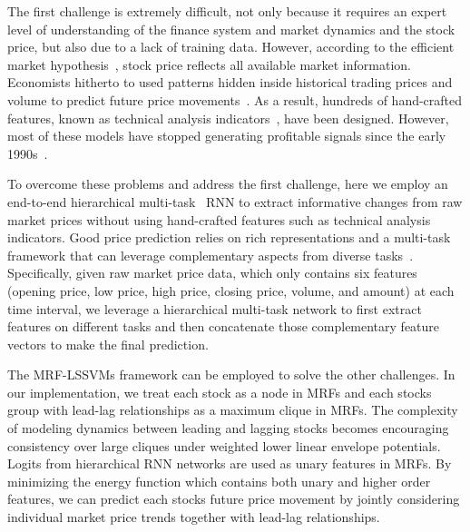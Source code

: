 The first challenge is extremely difficult, not only because it
requires an expert level of understanding of the finance system and
market dynamics and the stock price, but also
due to a lack of training data. However, according to the
efficient market
hypothesis~\cite{malkiel1970efficient}, stock price reflects all
available market information.
%
Economists hitherto to used patterns hidden inside historical
trading prices and volume to predict future price
movements~\cite{fama1966filter,jensen1967random}. As a result,
hundreds of hand-crafted features, known as technical analysis
indicators~\cite{kirkpatrick2010technical}, have been designed.
However, most of these models have stopped generating profitable
signals since the early 1990s~\cite{park2007we}.

To overcome these problems and address the first challenge, here
we employ an end-to-end hierarchical
multi-task~\cite{caruana1993multitask} RNN to extract informative
changes from raw market prices without using hand-crafted
features such as technical analysis indicators. Good price
prediction relies on rich representations and a multi-task
framework that can leverage complementary aspects from diverse
tasks~\cite{sogaard2016deep}. Specifically, given raw market
price data, which only contains six features (opening price, low
price, high price, closing price, volume, and amount) at each
time interval, we leverage a hierarchical multi-task network to
first extract features on different tasks and then concatenate
those complementary feature vectors to make the final prediction.

The MRF-LSSVMs framework can be employed to solve the other
challenges. In our implementation, we treat each stock as a node
in MRFs and each stock\textquotesingle s group with lead-lag
relationships as a maximum clique in MRFs. The complexity of
modeling dynamics between leading and lagging stocks becomes
encouraging consistency over large cliques under weighted lower
linear envelope potentials. Logits from hierarchical RNN networks
are used as unary features in MRFs. By minimizing the energy
function which contains both unary and higher order features, we
can predict each stock\textquotesingle s future price movement by
jointly considering individual market price trends together with
lead-lag relationships.

